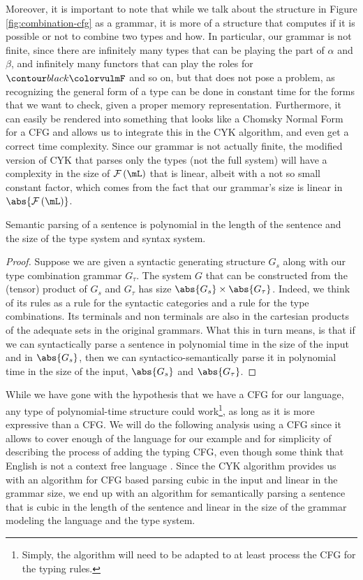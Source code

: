 \medskip

Moreover, it is important to note that while we talk about the structure in
Figure \ref{fig:combination-cfg} as a grammar, it is more of a structure that
computes if it is possible or not to combine two types and how.
In particular, our grammar is not finite, since there are infinitely many types
that can be playing the part of $\alpha$ and $\beta$, and infinitely many
functors that can play the roles for $\f{F}$ and so on, but that does not pose
a problem, as recognizing the general form of a type can be done in constant
time for the forms that we want to check, given a proper memory representation.
Furthermore, it can easily be rendered into something that looks like a
Chomsky Normal Form for a CFG and allows us to integrate this in the CYK
algorithm, and even get a correct time complexity.
Since our grammar is not actually finite, the modified version of CYK that
parses only the types (not the full system) will have a complexity in the
size of $\mFunc\left(\mL\right)$ that is linear, albeit with a not so
small constant factor, which comes from the fact that our grammar's size is
linear in $\abs{\mFunc\left(\mL\right)}$.

\begin{thm}
	\label{thm:ptime-parse}
	Semantic parsing of a sentence is polynomial in the length of the	sentence
	and the size of the type system and syntax system.
\end{thm}
\begin{proof}
	Suppose we are given a syntactic generating structure $G_{s}$ along with our
	type combination grammar $G_{\tau}$.
	The system $G$ that can be constructed from the (tensor) product of $G_{s}$ and
	$G_{\tau}$ has size $\abs{G_{s}}\times \abs{G_{\tau}}$.
	Indeed, we think of its rules as a rule for the syntactic categories and a rule
	for the type combinations. Its terminals and non terminals are also in the
	cartesian products of the adequate sets in the original grammars.
	What this in turn means, is that if we can syntactically parse a sentence in
	polynomial time in the size of the input and in $\abs{G_{s}}$, then we can
	syntactico-semantically parse it in polynomial time in the size of the input,
	$\abs{G_{s}}$ and $\abs{G_{\tau}}$.
\end{proof}

While we have gone with the hypothesis that we have a CFG for our language,
any type of polynomial-time structure could work\footnote{Simply, the algorithm
	will need to be	adapted to at least process the CFG for the typing rules.},
as long as it is more expressive than a CFG.
We will do the following analysis using a CFG since it allows to cover enough of
the language for our example and for simplicity of describing the process of
adding the typing CFG, even though some think that English is not a context
free language \cite{higginbothamEnglishNotContextFree1984}.
Since the CYK algorithm provides us with an algorithm for CFG based parsing
cubic in the input and linear in the grammar size, we end up with an algorithm
for semantically parsing a sentence that is cubic in the length of the sentence
and linear in the size of the grammar modeling the language and the type system.


